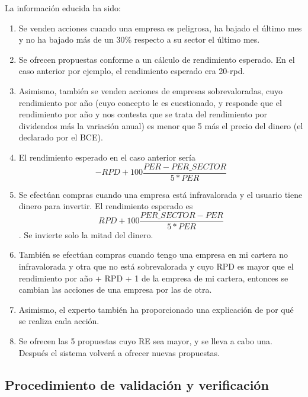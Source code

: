 \documentclass[a4paper,11pt]{article}
\begin{document}
La información educida ha sido:

\begin{enumerate}[$\rightarrow$]
 \item Se venden acciones cuando una empresa es peligrosa, ha bajado el último mes y no ha bajado más de un 30\% respecto 
 a su sector el último mes.
 \item Se ofrecen propuestas conforme a un cálculo de rendimiento esperado. En el caso anterior por ejemplo, el rendimiento
 esperado era 20-rpd.
 \item Asimismo, también se venden acciones de empresas sobrevaloradas, cuyo rendimiento por año (cuyo concepto
 le es cuestionado, y responde que el rendimiento por año y nos contesta que se trata del rendimiento por dividendos más la
 variación anual) es menor que 5 más el precio del dinero (el declarado por el BCE).
 \item El rendimiento esperado en el caso anterior sería $$-RPD + 100 \frac{PER - PER\_SECTOR}{5*PER}$$
 \item Se efectúan compras cuando una empresa está infravalorada y el usuario tiene dinero para invertir. El rendimiento esperado
 es $$RPD + 100 \frac{PER\_SECTOR - PER}{5*PER}$$. Se invierte solo la mitad del dinero.
 \item También se efectúan compras cuando tengo una empresa en mi cartera no infravalorada y otra que no está sobrevalorada
 y cuyo RPD es mayor que el rendimiento por año + RPD + 1 de la empresa de mi cartera, entonces se cambian las acciones de una
 empresa por las de otra.
 \item Asimismo, el experto también ha proporcionado una explicación de por qué se realiza cada acción.
 \item Se ofrecen las 5 propuestas cuyo RE sea mayor, y se lleva a cabo una. Después el sistema volverá a ofrecer nuevas propuestas.
\end{enumerate}


\subsection{Procedimiento de validación y verificación}
\end{document}
